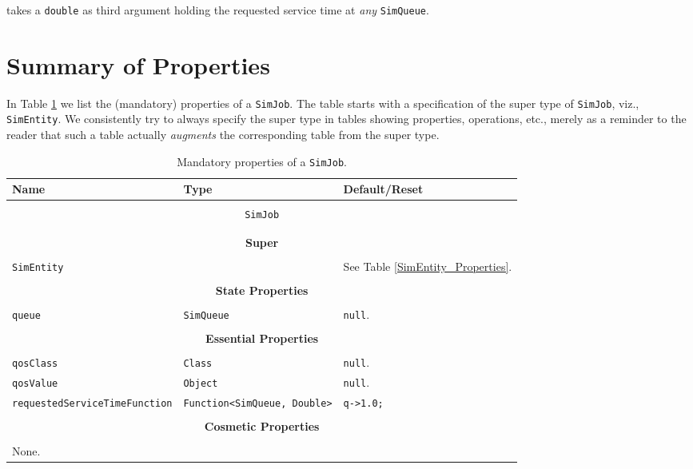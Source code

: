 \noindent takes a \lstinline|double| as third argument
  holding the requested service time at {\em any\/}
  \lstinline|SimQueue|.

\section{Summary of Properties}

In Table
  \ref{SimJob_Properties}
  we list the (mandatory) properties
  of a \lstinline|SimJob|.
The table starts with a specification of
  the super type of \lstinline|SimJob|,
  viz., \lstinline|SimEntity|.
We consistently try to always
  specify the super type in
  tables showing properties, operations,
  etc., merely as a reminder to the reader
  that such a table actually {\em augments\/}
  the corresponding table from the super type.
  
\begin{table}[!htbp]
\caption{Mandatory properties of a \lstinline|SimJob|.}
\label{SimJob_Properties}
\begin{center}
\begin{tabular}{|l|l|l|}
\hline
{\bf Name} & {\bf Type} & {\bf Default/Reset} \\
\hline
\multicolumn{3}{|c|}{} \\
\multicolumn{3}{|c|}{\lstinline[basicstyle=\large]{SimJob}} \\
\multicolumn{3}{|c|}{} \\
\hline
\multicolumn{3}{|c|}{} \\
\multicolumn{3}{|c|}{\bf Super} \\
\multicolumn{3}{|c|}{} \\
\hline
\multicolumn{2}{|l|}{\lstinline|SimEntity|}
  & See Table \ref{SimEntity_Properties}.
  \\
  \hline
\multicolumn{3}{|c|}{} \\
\multicolumn{3}{|c|}{\bf State Properties} \\
\multicolumn{3}{|c|}{} \\
\hline
\lstinline|queue|
  & \lstinline|SimQueue|
  & \lstinline|null|.
  \\
  \hline
\multicolumn{3}{|c|}{} \\
\multicolumn{3}{|c|}{\bf Essential Properties} \\
\multicolumn{3}{|c|}{} \\
\hline
\lstinline|qosClass|
  & \lstinline|Class|
  & \lstinline|null|.
  \\
  \hline
\lstinline|qosValue|
  & \lstinline|Object|
  & \lstinline|null|.
  \\
  \hline
\lstinline|requestedServiceTimeFunction|
  & \lstinline|Function<SimQueue, Double>|
  & \lstinline|q->1.0;|
  \\
  \hline
\multicolumn{3}{|c|}{} \\
\multicolumn{3}{|c|}{\bf Cosmetic Properties} \\
\multicolumn{3}{|c|}{} \\
\hline
\multicolumn{3}{|l|}{None.} \\
\hline
\end{tabular}
\end{center}
\end{table}
  
